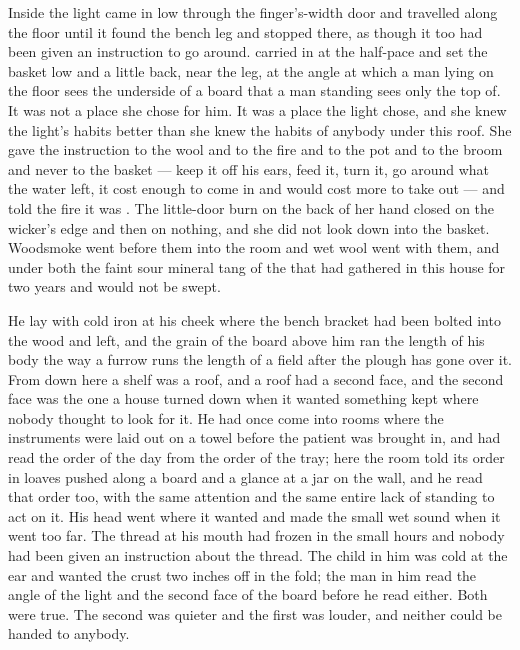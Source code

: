 Inside  the light came in low through the finger's-width door and travelled along the floor until it found the bench leg and stopped there, as though it too had been given an instruction to go around.  carried  in at the half-pace and set the basket low and a little back, near the leg, at the angle at which a man lying on the floor sees the underside of a board that a man standing sees only the top of. It was not a place she chose for him. It was a place the light chose, and she knew the light's habits better than she knew the habits of anybody under this roof. She gave the instruction to the wool and to the fire and to the pot and to the broom and never to the basket --- keep it off his ears, feed it, turn it, go around what the water left, it cost enough to come in and would cost more to take out --- and told the fire it was . The little-door burn on the back of her hand closed on the wicker's edge and then on nothing, and she did not look down into the basket. Woodsmoke went before them into the room and wet wool went with them, and under both the faint sour mineral tang of the  that had gathered in this house for two years and would not be swept.

He lay with cold iron at his cheek where the bench bracket had been bolted into the wood and left, and the grain of the board above him ran the length of his body the way a furrow runs the length of a field after the plough has gone over it. From down here a shelf was a roof, and a roof had a second face, and the second face was the one a house turned down when it wanted something kept where nobody thought to look for it. He had once come into rooms where the instruments were laid out on a towel before the patient was brought in, and had read the order of the day from the order of the tray; here the room told its order in loaves pushed along a board and a glance at a jar on the wall, and he read that order too, with the same attention and the same entire lack of standing to act on it. His head went where it wanted and made the small wet sound when it went too far. The thread at his mouth had frozen in the small hours and nobody had been given an instruction about the thread. The child in him was cold at the ear and wanted the crust two inches off in the fold; the man in him read the angle of the light and the second face of the board before he read either. Both were true. The second was quieter and the first was louder, and neither could be handed to anybody.

